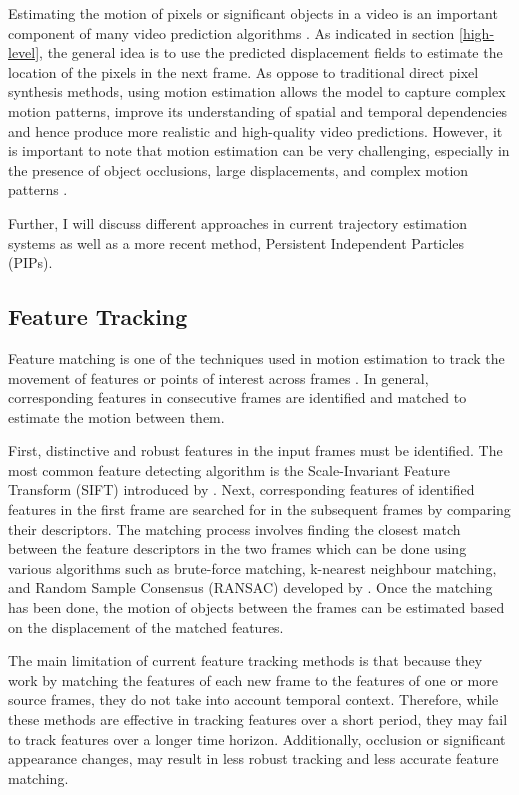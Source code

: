 \documentclass{l4proj}
\begin{document}
Estimating the motion of pixels or significant objects in a video is an important component of many video prediction algorithms \citep{DBLP:journals/corr/WalkerGH15, DBLP:journals/corr/PatrauceanHC15, DBLP:journals/corr/abs-1906-07889}. As indicated in section \ref{high-level}, the general idea is to use the predicted displacement fields to estimate the location of the pixels in the next frame. As oppose to traditional direct pixel synthesis methods, using motion estimation allows the model to capture complex motion patterns, improve its understanding of spatial and temporal dependencies and hence produce more realistic and high-quality video predictions. However, it is important to note that motion estimation can be very challenging, especially in the presence of object occlusions, large displacements, and complex motion patterns \citep{DBLP:journals/ijcv/Thompson98}.

Further, I will discuss different approaches in current trajectory estimation systems as well as a more recent method, Persistent Independent Particles (PIPs).

\subsection{Feature Tracking}

Feature matching is one of the techniques used in motion estimation to track the movement of features or points of interest across frames \citep{DBLP:journals/corr/abs-1906-07889}. In general, corresponding features in consecutive frames are identified and matched to estimate the motion between them.

First, distinctive and robust features in the input frames must be identified. The most common feature detecting algorithm is the Scale-Invariant Feature Transform (SIFT) introduced by \cite{DBLP:journals/ijcv/Lowe04}. Next, corresponding features of identified features in the first frame are searched for in the subsequent frames by comparing their descriptors. The matching process involves finding the closest match between the feature descriptors in the two frames which can be done using various algorithms such as brute-force matching, k-nearest neighbour matching, and Random Sample Consensus (RANSAC) developed by \cite{DBLP:journals/cacm/FischlerB81}. Once the matching has been done, the motion of objects between the frames can be estimated based on the displacement of the matched features.

The main limitation of current feature tracking methods is that because they work by matching the features of each new frame to the features of one or more source frames, they do not take into account temporal context. Therefore, while these methods are effective in tracking features over a short period, they may fail to track features over a longer time horizon. Additionally, occlusion or significant appearance changes, may result in less robust tracking and less accurate feature matching. 
\end{document}
